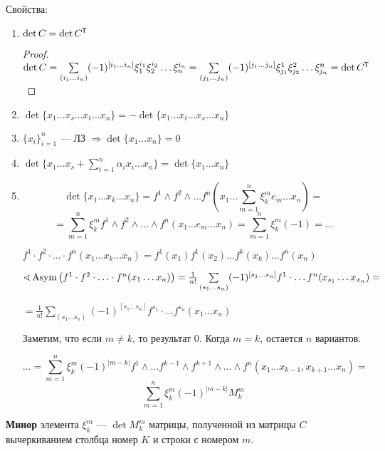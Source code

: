 Свойства:
\begin{enumerate}
    \item \(\det C=\det C^{\mkern-1.5mu\mathsf{T}} \)
          \begin{proof}
              \(\det C = \sum\limits_{(i_1\ldots i_n)}(-1)^{[i_1\ldots i_n]}\xi_1^{i_1}\xi_2^{i_2}\ldots \xi_n^{i_n} = \sum\limits_{(j_1\ldots j_n)}(-1)^{[j_1\ldots j_n]} \xi^1_{j_1}\xi^2_{j_2}\ldots \xi^n_{j_n}=\det C^{\mkern-1.5mu\mathsf{T}} \)
          \end{proof}
    \item \(\det \{x_1\ldots x_s\ldots x_t\ldots x_n\}=-\det \{x_1\ldots x_t\ldots x_s\ldots x_n\}\)
    \item \(\{x_i\}_{i=1}^n\) --- ЛЗ \(\Rightarrow \det \{x_1\ldots x_n\}=0\)
    \item \(\det\{x_1\ldots x_s+\sum\limits_{i=1}^n\alpha_i x_i\ldots x_n\}=\det\{x_1\ldots x_n\}\)
    \item \[\det\{x_1\ldots x_k\ldots x_n\}=f^1\wedge f^2\wedge \ldots f^n(x_1\ldots \sum\limits_{m=1}^{n}\xi_k^me_m\ldots x_n)=\]\[=\sum\limits_{m=1}^{n}\xi^m_k f^1\wedge f^2\wedge\ldots\wedge f^n(x_1\ldots e_m\ldots x_n)=\sum\limits_{m=1}^{n}\xi_k^m(-1)=\ldots\]
          \begin{remark}
              \(f^1\cdot f^2\cdot \ldots \cdot f^n(x_1\ldots x_k\ldots x_n)=f^1(x_1)f^1(x_2)\ldots f^k(x_k)\ldots f^n(x_n)\)

              \(\sphericalangle \operatorname{\text{Asym}}\left(f^1\cdot f^2\cdot \ldots \cdot f^n(x_1\ldots x_n) \right)=\frac{1}{n!}\sum\limits_{(s_1\ldots s_n)}(-1)^{[s_1\ldots s_n]} f^1\cdot \ldots f^n(x_{s_1}\ldots x_{x_n})=\)

              \(=\frac{1}{n!}\sum\limits_{(s_1\ldots s_n)}(-1)^{[s_1\ldots s_n]} f^{s_1}\cdot \ldots f^{s_n}(x_1\ldots x_n)\)

              Заметим, что если \(m\not=k\), то результат \(0\). Когда \(m=k\), остается \(n\) вариантов.
          \end{remark}

          \[\ldots =\sum\limits_{m=1}^n \xi_k^m (-1)^{|m-k|} f^1\wedge \ldots f^{k-1}\wedge f^{k+1}\wedge\ldots\wedge f^n(x_1\ldots x_{k-1},x_{k+1}\ldots x_n)=\]
          \[\sum\limits_{m=1}^n \xi_k^m(-1)^{|m-k|}M_k^m\]
\end{enumerate}
\begin{definition}
    \textbf{Минор} элемента \(\xi_k^m\) --- \(\det M_k^m\) матрицы, полученной из матрицы \(C\) вычеркиванием столбца номер \(K\) и строки с номером \(m\).
\end{definition}

